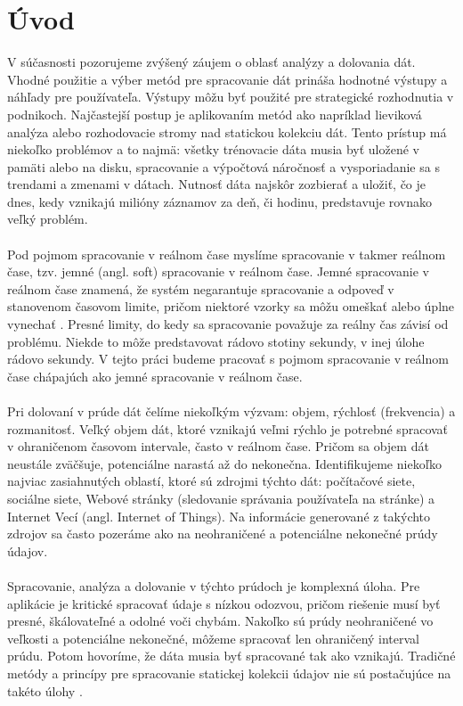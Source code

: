 
\chapter{Úvod}
V súčasnosti pozorujeme zvýšený záujem o oblasť analýzy a dolovania dát. Vhodné použitie a výber metód pre spracovanie dát prináša hodnotné výstupy a náhľady pre používateľa. Výstupy môžu byť použité pre strategické rozhodnutia v podnikoch. Najčastejší postup je aplikovaním metód ako napríklad lieviková analýza alebo rozhodovacie stromy nad statickou kolekciu dát. Tento prístup má niekoľko problémov a to najmä: všetky trénovacie dáta musia byť uložené v pamäti alebo na disku, spracovanie a výpočtová náročnosť a vysporiadanie sa s trendami a zmenami v dátach. Nutnosť dáta najskôr zozbierať a uložiť, čo je dnes, kedy vznikajú milióny záznamov za deň, či hodinu, predstavuje rovnako veľký problém.\\
\\
Pod pojmom spracovanie v reálnom čase myslíme spracovanie v takmer reálnom čase, tzv. jemné (angl. soft) spracovanie v reálnom čase. Jemné spracovanie v reálnom čase znamená, že systém negarantuje spracovanie a odpoveď v stanovenom časovom limite, pričom niektoré vzorky sa môžu omeškať alebo úplne vynechať \citep{stankovic1988real}. Presné limity, do kedy sa spracovanie považuje za reálny čas závisí od problému. Niekde to môže predstavovat rádovo stotiny sekundy, v inej úlohe rádovo sekundy. V tejto práci budeme pracovať s pojmom spracovanie v reálnom čase chápajúch ako jemné spracovanie v reálnom čase.\\
\\
Pri dolovaní v prúde dát čelíme niekoľkým výzvam: objem,  rýchlosť (frekvencia) a rozmanitosť. Veľký objem dát, ktoré vznikajú veľmi rýchlo je potrebné spracovať v ohraničenom časovom intervale, často v reálnom čase. Pričom sa objem dát neustále zväčšuje, potenciálne narastá až do nekonečna. Identifikujeme niekoľko najviac zasiahnutých oblastí, ktoré sú zdrojmi týchto dát: počítačové siete, sociálne siete, Webové stránky (sledovanie správania používateľa na stránke) a Internet Vecí (angl. Internet of Things). Na informácie generované z takýchto zdrojov sa často pozeráme ako na neohraničené a potenciálne nekonečné prúdy údajov.\\
\\
Spracovanie, analýza a dolovanie v týchto prúdoch je komplexná úloha. Pre aplikácie je kritické spracovať údaje s nízkou odozvou, pričom riešenie musí byť presné, škálovateľné a odolné voči chybám. Nakoľko sú prúdy neohraničené vo veľkosti a potenciálne nekonečné, môžeme spracovať len ohraničený interval prúdu. Potom hovoríme, že dáta musia byť spracované tak ako vznikajú. Tradičné metódy a princípy pre spracovanie statickej kolekcii údajov nie sú postačujúce na takéto úlohy \citep{krempl2014open, han2011data}.
